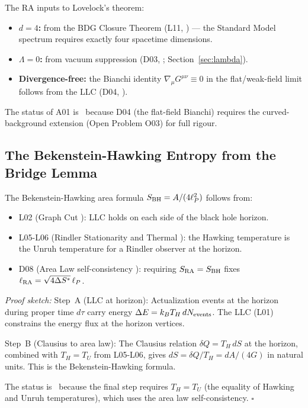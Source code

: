 \documentclass[12pt,a4paper]{article}
\begin{document}
The RA inputs to Lovelock's theorem:
\begin{itemize}
  \item \textbf{$d=4$:} from the BDG Closure Theorem (L11, \statusLV) --- the Standard Model spectrum requires exactly four spacetime dimensions.
  \item \textbf{$\Lambda=0$:} from vacuum suppression (D03, \statusDR; Section~\ref{sec:lambda}).
  \item \textbf{Divergence-free:} the Bianchi identity $\nabla_\mu G^{\mu\nu}\equiv0$ in the flat/weak-field limit follows from the LLC (D04, \statusDR).
\end{itemize}

The status of A01 is \statusAR\ because D04 (the flat-field Bianchi) requires the curved-background extension (Open Problem O03) for full rigour.

\subsection{The Bekenstein-Hawking Entropy from the Bridge Lemma}

\begin{theorem}
The Bekenstein-Hawking area formula $S_{\rm BH}=A/(4\ell_P^2)$ follows from:
\begin{itemize}
  \item L02 (Graph Cut \statusLV): LLC holds on each side of the black hole horizon.
  \item L05-L06 (Rindler Stationarity and Thermal \statusLV): the Hawking temperature is the Unruh temperature for a Rindler observer at the horizon.
  \item D08 (Area Law self-consistency \statusAR): requiring $S_{\rm RA}=S_{\rm BH}$ fixes $\ell_{\rm RA}=\sqrt{4\Delta S^*}\,\ell_P$.
\end{itemize}
\end{theorem}

\textit{Proof sketch:}
Step~A (LLC at horizon): Actualization events at the horizon during proper time $d\tau$ carry energy $\Delta E = k_BT_H\,dN_{\rm events}$.  The LLC (L01) constrains the energy flux at the horizon vertices.

Step~B (Clausius to area law): The Clausius relation $\delta Q = T_H\,dS$ at the horizon, combined with $T_H = T_U$ from L05-L06, gives $dS = \delta Q/T_H = dA/(4G)$ in natural units.  This is the Bekenstein-Hawking formula.

The status is \statusAR\ because the final step requires $T_H=T_U$ (the equality of Hawking and Unruh temperatures), which uses the area law self-consistency. \qquad$\square$
\end{document}
